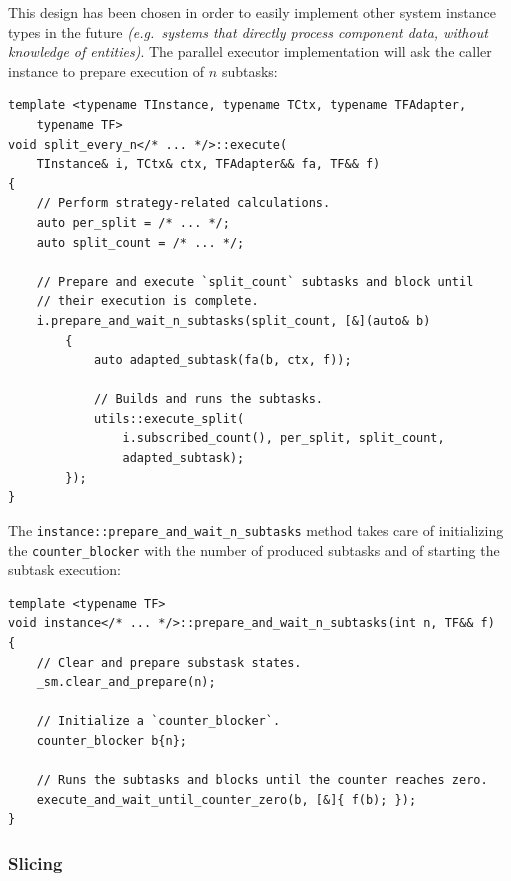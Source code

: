\documentclass[twoside, 12pt, a4paper, openright]{book}
\begin{document}
This design has been chosen in order to easily implement other system
instance types in the future \emph{(e.g.~systems that directly process
component data, without knowledge of entities)}. The parallel executor
implementation will ask the caller instance to prepare execution of
\(n\) subtasks:

\begin{verbatim}
template <typename TInstance, typename TCtx, typename TFAdapter,
    typename TF>
void split_every_n</* ... */>::execute(
    TInstance& i, TCtx& ctx, TFAdapter&& fa, TF&& f)
{
    // Perform strategy-related calculations.
    auto per_split = /* ... */;
    auto split_count = /* ... */;

    // Prepare and execute `split_count` subtasks and block until
    // their execution is complete.
    i.prepare_and_wait_n_subtasks(split_count, [&](auto& b)
        {
            auto adapted_subtask(fa(b, ctx, f));

            // Builds and runs the subtasks.
            utils::execute_split(
                i.subscribed_count(), per_split, split_count,
                adapted_subtask);
        });
}
\end{verbatim}

The
\texttt{instance::prepare_and_wait_n_subtasks}
method takes care of initializing the
\texttt{counter_blocker}
with the number of produced subtasks and of starting the subtask
execution:

\begin{verbatim}
template <typename TF>
void instance</* ... */>::prepare_and_wait_n_subtasks(int n, TF&& f)
{
    // Clear and prepare substask states.
    _sm.clear_and_prepare(n);

    // Initialize a `counter_blocker`.
    counter_blocker b{n};

    // Runs the subtasks and blocks until the counter reaches zero.
    execute_and_wait_until_counter_zero(b, [&]{ f(b); });
}
\end{verbatim}

\hypertarget{inner_par_slicing}{\subsubsection{Slicing}\label{inner_par_slicing}}
\end{document}
